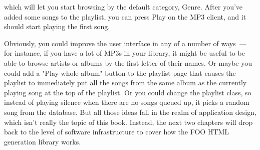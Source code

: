 which will let you start browsing by the default category, Genre. After you've added some
songs to the playlist, you can press Play on the MP3 client, and it should start playing
the first song.

Obviously, you could improve the user interface in any of a number of ways~--- for
instance, if you have a lot of MP3s in your library, it might be useful to be able to
browse artists or albums by the first letter of their names. Or maybe you could add a
"Play whole album" button to the playlist page that causes the playlist to immediately put
all the songs from the same album as the currently playing song at the top of the
playlist. Or you could change the playlist class, so instead of playing silence when there
are no songs queued up, it picks a random song from the database. But all those ideas fall
in the realm of application design, which isn't really the topic of this book. Instead,
the next two chapters will drop back to the level of software infrastructure to cover how
the FOO HTML generation library works.

